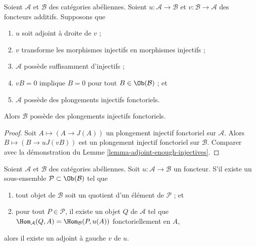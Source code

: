 \begin{lemma}
\label{lemma-adjoint-functorial-injectives}
Soient $\mathcal{A}$ et $\mathcal{B}$ des catégories abéliennes.
Soient $u : \mathcal{A} \to \mathcal{B}$ et
$v : \mathcal{B} \to \mathcal{A}$ des foncteurs additifs.
Supposons que
\begin{enumerate}
\item $u$ soit adjoint à droite de $v$ ;
\item $v$ transforme les morphismes injectifs en morphismes injectifs ;
\item $\mathcal{A}$ possède suffisamment d'injectifs ;
\item $vB = 0$ implique $B = 0$ pour tout $B \in \Ob(\mathcal{B})$ ; et
\item $\mathcal{A}$ possède des plongements injectifs fonctoriels.
\end{enumerate}
Alors $\mathcal{B}$ possède des plongements injectifs fonctoriels.
\end{lemma}

\begin{proof}
Soit $A \mapsto (A \to J(A))$ un plongement injectif fonctoriel
sur $\mathcal{A}$. Alors
$B \mapsto (B \to uJ(vB))$ est un plongement injectif fonctoriel
sur $\mathcal{B}$. Comparer avec la démonstration du
Lemme \ref{lemma-adjoint-enough-injectives}.
\end{proof}

\begin{lemma}
\label{lemma-partially-defined-adjoint}
Soient $\mathcal{A}$ et $\mathcal{B}$ des catégories abéliennes.
Soit $u : \mathcal{A} \to \mathcal{B}$ un foncteur.
S'il existe un sous-ensemble $\mathcal{P} \subset \Ob(\mathcal{B})$
tel que
\begin{enumerate}
\item tout objet de $\mathcal{B}$ soit un quotient d'un élément
de $\mathcal{P}$ ; et
\item pour tout $P \in \mathcal{P}$, il existe un objet
$Q$ de $\mathcal{A}$ tel que
$\Hom_\mathcal{A}(Q, A) = \Hom_\mathcal{B}(P, u(A))$ fonctoriellement
en $A$,
\end{enumerate}
alors il existe un adjoint à gauche $v$ de $u$.
\end{lemma}

